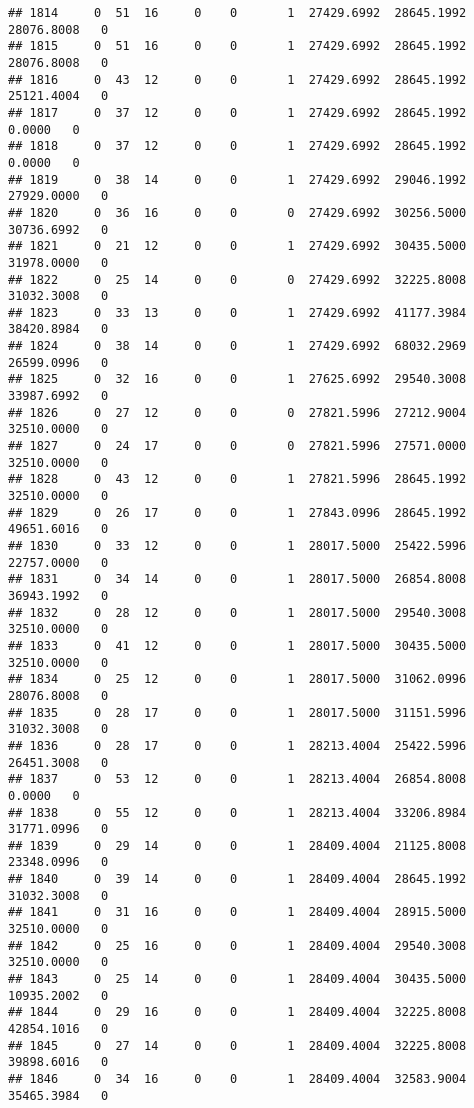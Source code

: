 \documentclass[
]{article}
\begin{document}
\begin{enumerate}
\begin{verbatim}
## 1814     0  51  16     0    0       1  27429.6992  28645.1992  28076.8008   0
## 1815     0  51  16     0    0       1  27429.6992  28645.1992  28076.8008   0
## 1816     0  43  12     0    0       1  27429.6992  28645.1992  25121.4004   0
## 1817     0  37  12     0    0       1  27429.6992  28645.1992      0.0000   0
## 1818     0  37  12     0    0       1  27429.6992  28645.1992      0.0000   0
## 1819     0  38  14     0    0       1  27429.6992  29046.1992  27929.0000   0
## 1820     0  36  16     0    0       0  27429.6992  30256.5000  30736.6992   0
## 1821     0  21  12     0    0       1  27429.6992  30435.5000  31978.0000   0
## 1822     0  25  14     0    0       0  27429.6992  32225.8008  31032.3008   0
## 1823     0  33  13     0    0       1  27429.6992  41177.3984  38420.8984   0
## 1824     0  38  14     0    0       1  27429.6992  68032.2969  26599.0996   0
## 1825     0  32  16     0    0       1  27625.6992  29540.3008  33987.6992   0
## 1826     0  27  12     0    0       0  27821.5996  27212.9004  32510.0000   0
## 1827     0  24  17     0    0       0  27821.5996  27571.0000  32510.0000   0
## 1828     0  43  12     0    0       1  27821.5996  28645.1992  32510.0000   0
## 1829     0  26  17     0    0       1  27843.0996  28645.1992  49651.6016   0
## 1830     0  33  12     0    0       1  28017.5000  25422.5996  22757.0000   0
## 1831     0  34  14     0    0       1  28017.5000  26854.8008  36943.1992   0
## 1832     0  28  12     0    0       1  28017.5000  29540.3008  32510.0000   0
## 1833     0  41  12     0    0       1  28017.5000  30435.5000  32510.0000   0
## 1834     0  25  12     0    0       1  28017.5000  31062.0996  28076.8008   0
## 1835     0  28  17     0    0       1  28017.5000  31151.5996  31032.3008   0
## 1836     0  28  17     0    0       1  28213.4004  25422.5996  26451.3008   0
## 1837     0  53  12     0    0       1  28213.4004  26854.8008      0.0000   0
## 1838     0  55  12     0    0       1  28213.4004  33206.8984  31771.0996   0
## 1839     0  29  14     0    0       1  28409.4004  21125.8008  23348.0996   0
## 1840     0  39  14     0    0       1  28409.4004  28645.1992  31032.3008   0
## 1841     0  31  16     0    0       1  28409.4004  28915.5000  32510.0000   0
## 1842     0  25  16     0    0       1  28409.4004  29540.3008  32510.0000   0
## 1843     0  25  14     0    0       1  28409.4004  30435.5000  10935.2002   0
## 1844     0  29  16     0    0       1  28409.4004  32225.8008  42854.1016   0
## 1845     0  27  14     0    0       1  28409.4004  32225.8008  39898.6016   0
## 1846     0  34  16     0    0       1  28409.4004  32583.9004  35465.3984   0

\end{verbatim}
\end{enumerate}
\end{document}
